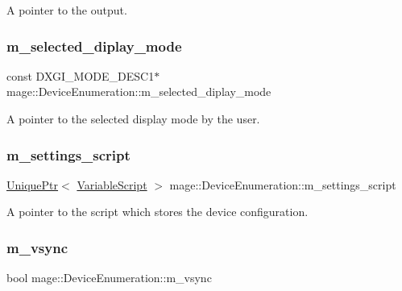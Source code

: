 A pointer to the output. \hypertarget{classmage_1_1_device_enumeration_a74b32839bda6446db56aaf4b6dd25f20}{}\label{classmage_1_1_device_enumeration_a74b32839bda6446db56aaf4b6dd25f20} 
\subsubsection{\texorpdfstring{m\+\_\+selected\+\_\+diplay\+\_\+mode}{m\_selected\_diplay\_mode}}
{\footnotesize\ttfamily const D\+X\+G\+I\+\_\+\+M\+O\+D\+E\+\_\+\+D\+E\+S\+C1$\ast$ mage\+::\+Device\+Enumeration\+::m\+\_\+selected\+\_\+diplay\+\_\+mode\hspace{0.3cm}{\ttfamily [private]}}

A pointer to the selected display mode by the user. \hypertarget{classmage_1_1_device_enumeration_ab6a58580daf27bff07ba7df428833616}{}\label{classmage_1_1_device_enumeration_ab6a58580daf27bff07ba7df428833616} 
\subsubsection{\texorpdfstring{m\+\_\+settings\+\_\+script}{m\_settings\_script}}
{\footnotesize\ttfamily \hyperlink{namespacemage_a8c307fbcc33bce9b7f2aa4c26c3b95cf}{Unique\+Ptr}$<$ \hyperlink{classmage_1_1_variable_script}{Variable\+Script} $>$ mage\+::\+Device\+Enumeration\+::m\+\_\+settings\+\_\+script\hspace{0.3cm}{\ttfamily [private]}}

A pointer to the script which stores the device configuration. \hypertarget{classmage_1_1_device_enumeration_a027220f50649c40785e2b918411adfad}{}\label{classmage_1_1_device_enumeration_a027220f50649c40785e2b918411adfad} 
\subsubsection{\texorpdfstring{m\+\_\+vsync}{m\_vsync}}
{\footnotesize\ttfamily bool mage\+::\+Device\+Enumeration\+::m\+\_\+vsync\hspace{0.3cm}{\ttfamily [private]}}

